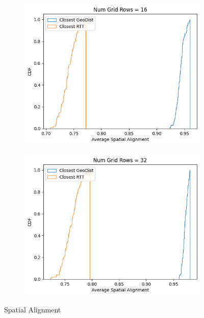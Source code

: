 \begin{figure}
\begin{subfigure}{0.45\textwidth}
  \centering
  \includegraphics[width=\linewidth]{figures/mechanisms/spatial_ctx_mgmt/spatial_alignment_randomized_16_rows.png}
  \caption{}
\end{subfigure}%
\begin{subfigure}{0.45\textwidth}
  \centering
  \includegraphics[width=\linewidth]{figures/mechanisms/spatial_ctx_mgmt/spatial_alignment_randomized_32_rows.png}
  \caption{}
\end{subfigure}
\caption{Spatial Alignment}
\label{fig:spatial_alignment_eval}
\end{figure}

